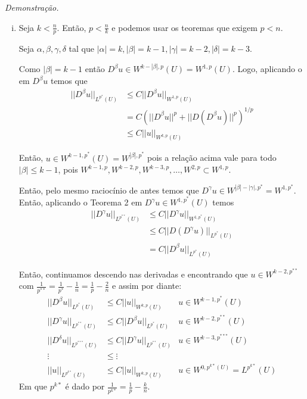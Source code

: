 \documentclass[a4paper, 11pt]{article}
\begin{document}
\textit{Demonstração.}\begin{enumerate}[(i)]
	\item Seja $k < \frac{n}{p}$. Então, \( p < \frac{n}{k} \) e podemos usar os teoremas que exigem $p<n$.
	
	Seja $\alpha, \beta, \gamma, \delta$ tal que $|\alpha|=k, |\beta|=k-1, |\gamma|=k-2, |\delta|=k-3$.
	
	Como $|\beta|=k-1$ então $D^\beta u \in W^{k - |\beta|,p}(U) = W^{1,p}(U)$. Logo, aplicando o  em $D^\beta u$ temos que  \begin{align*}
		||D^\beta u||_{L^{p^*}(U)} &\leq C || D^\beta u ||_{W^{1,p}(U)} \\ &= C\left( ||D^\beta u||^p + ||D(D^\beta u)||^p \right)^{1/p} \\
		&\leq C ||u||_{W^{k,p}(U)}
	\end{align*}
	
	Então, $u \in W^{k-1,p^*}(U) = W^{|\beta|, p^*}$ pois a relação acima vale para todo $|\beta|\leq k-1$, pois $ W^{k-1,p}, W^{k-2,p}, W^{k-3,p}, \ldots, W^{2,p} \subset W^{1,p} $.
	
	Então, pelo mesmo raciocínio de antes temos que $ D^\gamma u \in W^{|\beta| - |\gamma|,p^*} = W^{1,p^*} $. Então, aplicando o Teorema 2 em $D^\gamma u \in W^{1,p^*}(U)$ temos \begin{align*}
		||D^\gamma u||_{L^{p^{**}}(U)} &\leq C ||D^\gamma u ||_{W^{1,p^*}(U)} \\ &\leq C ||D(D^\gamma u)||_{L^{p^*}(U)}\\ &= C ||D^\beta u||_{L^{p^*}(U)}
	\end{align*}
	
	Então, continuamos descendo nas derivadas e encontrando que $u \in W^{k-2, p^{**}}$ com $\frac{1}{p^{**}} = \frac{1}{p^*} - \frac{1}{n} = \frac{1}{p} - \frac{2}{n}$ e assim por diante: \begin{align*}
		||D^\beta u||_{L^{p^*}(U)} &\leq C ||u||_{W^{k,p}(U)} & u \in W^{k-1,p^*}(U)\\
		||D^\gamma u||_{L^{p^{**}}(U)} &\leq C ||D^\beta u||_{L^{p^*}(U)} & u \in W^{k-2, p^{**}}(U) \\
		||D^\delta u||_{L^{p^{***}}(U)} &\leq C ||D^\gamma u||_{L^{p^{**}}(U)} & u \in W^{k-3, p^{***}}(U) \\
		\vdots &\leq \vdots \\
		||u||_{L^{p^{k*}}(U)} &\leq C ||u||_{W^{k,p}(U)} & u \in W^{0, p^{k*}(U)} = L^{p^{k*}}(U)  
	\end{align*}
	Em que $ p^{k*} $ é dado por $ \frac{1}{p^{k*}} = \frac{1}{p} - \frac{k}{n} $. 
	

\end{enumerate}
\end{document}

